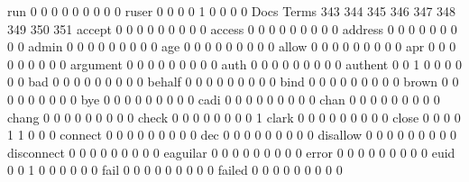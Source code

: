 \documentclass[compress,8pt]{beamer}
\begin{document}
\begin{frame}
\begin{Schunk}
  run                                        0   0   0   0   0   0   0   0   0
  ruser                                      0   0   0   0   1   0   0   0   0
                                          Docs
Terms                                      343 344 345 346 347 348 349 350 351
  accept                                     0   0   0   0   0   0   0   0   0
  access                                     0   0   0   0   0   0   0   0   0
  address                                    0   0   0   0   0   0   0   0   0
  admin                                      0   0   0   0   0   0   0   0   0
  age                                        0   0   0   0   0   0   0   0   0
  allow                                      0   0   0   0   0   0   0   0   0
  apr                                        0   0   0   0   0   0   0   0   0
  argument                                   0   0   0   0   0   0   0   0   0
  auth                                       0   0   0   0   0   0   0   0   0
  authent                                    0   0   1   0   0   0   0   0   0
  bad                                        0   0   0   0   0   0   0   0   0
  behalf                                     0   0   0   0   0   0   0   0   0
  bind                                       0   0   0   0   0   0   0   0   0
  brown                                      0   0   0   0   0   0   0   0   0
  bye                                        0   0   0   0   0   0   0   0   0
  cadi                                       0   0   0   0   0   0   0   0   0
  chan                                       0   0   0   0   0   0   0   0   0
  chang                                      0   0   0   0   0   0   0   0   0
  check                                      0   0   0   0   0   0   0   0   1
  clark                                      0   0   0   0   0   0   0   0   0
  close                                      0   0   0   0   1   1   0   0   0
  connect                                    0   0   0   0   0   0   0   0   0
  dec                                        0   0   0   0   0   0   0   0   0
  disallow                                   0   0   0   0   0   0   0   0   0
  disconnect                                 0   0   0   0   0   0   0   0   0
  eaguilar                                   0   0   0   0   0   0   0   0   0
  error                                      0   0   0   0   0   0   0   0   0
  euid                                       0   0   1   0   0   0   0   0   0
  fail                                       0   0   0   0   0   0   0   0   0
  failed                                     0   0   0   0   0   0   0   0   0

\end{Schunk}
\end{frame}
\end{document}
